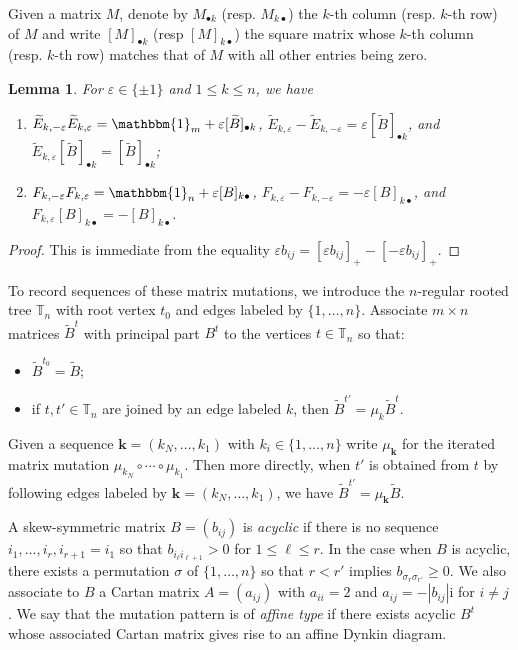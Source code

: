\documentclass{amsart}
\newtheorem{lemma}[theorem]{Lemma}
\numberwithin{theorem}{section}
\newcommand{\bfk}{{\boldsymbol{k}}}
\newcommand{\TT}{\mathbb{T}}
\newcommand{\bOne}{\mathbbm{1}}
\begin{document}
  Given a matrix $M$, denote by $M_{\bullet k}$ (resp. $M_{k \bullet}$) the $k$-th column (resp. $k$-th row) of $M$ and write $[M]_{\bullet k}$ (resp $[M]_{k\bullet}$)  the square matrix whose $k$-th column (resp. $k$-th row) matches that of $M$ with all other entries being zero.
  \begin{lemma}
    For $\varepsilon\in\{\pm1\}$ and $1\le k \le n$, we have 
    \begin{enumerate}
      \item $\widetilde E_{k,-\varepsilon} \widetilde E_{k,\varepsilon} = \bOne_m + \varepsilon [\widetilde B]_{\bullet k}$, $\widetilde E_{k,\varepsilon} - \widetilde E_{k,-\varepsilon} = \varepsilon [\widetilde B]_{\bullet k}$, and $\widetilde E_{k,\varepsilon} [\widetilde B]_{\bullet k} = [\widetilde B]_{\bullet k}$;
      \item $F_{k,-\varepsilon} F_{k,\varepsilon} = \bOne_n + \varepsilon [B]_{k \bullet}$, $F_{k,\varepsilon} - F_{k,-\varepsilon} = -\varepsilon [B]_{k \bullet}$, and $F_{k,\varepsilon} [B]_{k \bullet} = -[B]_{k \bullet}$.
    \end{enumerate}
  \end{lemma}
  \begin{proof}
    This is immediate from the equality $\varepsilon b_{ij}=[\varepsilon b_{ij}]_+-[-\varepsilon b_{ij}]_+$.
  \end{proof}

  To record sequences of these matrix mutations, we introduce the $n$-regular rooted tree $\TT_n$ with root vertex $t_0$ and edges labeled by $\{1,\ldots,n\}$.
  Associate $m\times n$ matrices $\widetilde{B}^t$ with principal part $B^t$ to the vertices $t\in\TT_n$ so that:
  \begin{itemize}
    \item $\widetilde{B}^{t_0}=\widetilde{B}$;
    \item if $t,t'\in\TT_n$ are joined by an edge labeled $k$, then $\widetilde{B}^{t'}=\mu_k \widetilde{B}^t$.
  \end{itemize}
  Given a sequence $\bfk=(k_N,\ldots,k_1)$ with $k_i\in\{1,\ldots,n\}$ write $\mu_\bfk$ for the iterated matrix mutation $\mu_{k_N}\circ\cdots\circ\mu_{k_1}$.
  Then more directly, when $t'$ is obtained from $t$ by following edges labeled by $\bfk=(k_N,\ldots,k_1)$, we have $\widetilde B^{t'}=\mu_\bfk \widetilde B$.

  A skew-symmetric matrix $B=(b_{ij})$ is \emph{acyclic} if there is no sequence $i_1,\ldots,i_r,i_{r+1}=i_1$ so that $b_{i_\ell i_{\ell+1}}>0$ for $1\le\ell\le r$.
  In the case when $B$ is acyclic, there exists a permutation $\sigma$ of $\{1,\ldots,n\}$ so that $r<r'$ implies $b_{\sigma_r \sigma_{r'}}\ge 0$.
  We also associate to $B$ a Cartan matrix $A=(a_{ij})$ with $a_{ii}=2$ and $a_{ij}=-|b_{ij}|$i for $i\ne j$.
  We say that the mutation pattern is of \emph{affine type} if there exists acyclic $B^t$ whose associated Cartan matrix gives rise to an affine Dynkin diagram.
  
\end{document}
